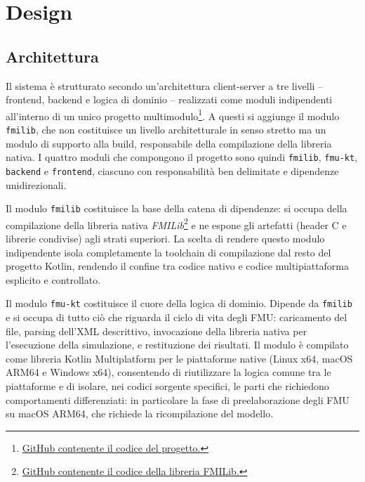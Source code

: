 \chapter{Design}
\label{chap:design}

\section{Architettura}
\label{sec:design-architettura}

Il sistema è strutturato secondo un'architettura client-server a tre livelli -- frontend, backend e logica di dominio -- realizzati come moduli indipendenti all'interno di un unico progetto multimodulo\footnote{\href{https://github.com/Sohaib-Ouakani/progetto-tirocinio.git}{GitHub contenente il codice del progetto.}}. A questi si aggiunge il modulo \texttt{fmilib}, che non costituisce un livello architetturale in senso stretto ma un modulo di supporto alla build, responsabile della compilazione della libreria nativa. I quattro moduli che compongono il progetto sono quindi \texttt{fmilib}, \texttt{fmu-kt}, \texttt{backend} e \texttt{frontend}, ciascuno con responsabilità ben delimitate e dipendenze unidirezionali.

Il modulo \texttt{fmilib} costituisce la base della catena di dipendenze: si occupa della compilazione della libreria nativa \emph{FMILib}\footnote{\href{https://github.com/modelon-community/fmi-library}{GitHub contenente il codice della libreria FMILib.}} e ne espone gli artefatti (header C e librerie condivise) agli strati superiori. La scelta di rendere questo modulo indipendente isola completamente la toolchain di compilazione dal resto del progetto Kotlin, rendendo il confine tra codice nativo e codice multipiattaforma esplicito e controllato.

Il modulo \texttt{fmu-kt} costituisce il cuore della logica di dominio. Dipende da \texttt{fmilib} e si occupa di tutto ciò che riguarda il ciclo di vita degli FMU: caricamento del file, parsing dell'XML descrittivo, invocazione della libreria nativa per l'esecuzione della simulazione, e restituzione dei risultati. Il modulo è compilato come libreria Kotlin Multiplatform per le piattaforme native (Linux x64, macOS ARM64 e Windows x64), consentendo di riutilizzare la logica comune tra le piattaforme e di isolare, nei codici sorgente specifici, le parti che richiedono comportamenti differenziati: in particolare la fase di preelaborazione degli FMU su macOS ARM64, che richiede la ricompilazione del modello.

